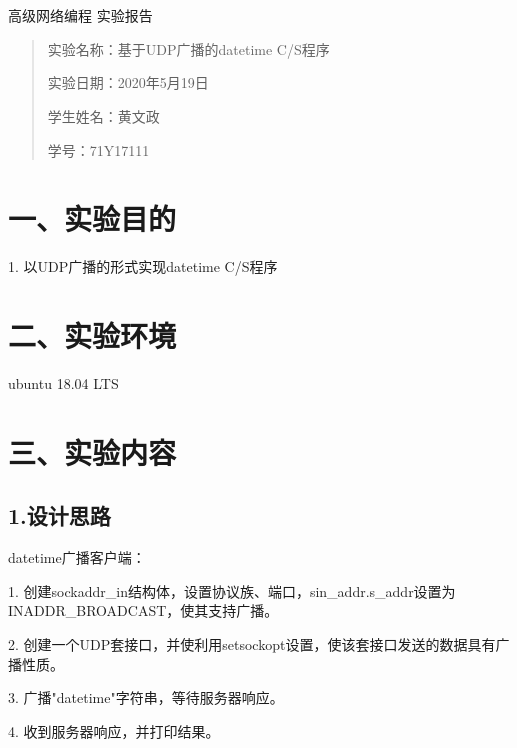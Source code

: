 \documentclass[UTF8]{ctexart}
\begin{document}
	\begin{center}
		\quad \\
		\quad \\
		\heiti \fontsize{45}{17} 高级网络编程
		\vskip 2.0cm
		\heiti \fontsize{39}{17} 实验报告	
	\end{center}
	\vskip 3.5cm
	\begin{quotation}
		\par\setlength\parindent{8.5em}
		\quad 
		\heiti 
		
		实验名称：基于UDP广播的datetime C/S程序
		
		实验日期：2020年5月19日
	
		学生姓名：黄文政
		
		学\hspace{0.72cm}号：71Y17111
		
		\vskip 2cm
		\centering
	\end{quotation}
	
\newpage
\songti \fontsize{13}{13}
\large
\section*{一、实验目的}

1. 以UDP广播的形式实现datetime C/S程序

\section*{二、实验环境}
ubuntu 18.04 LTS

\section*{三、实验内容}
\subsection*{1.设计思路}

datetime广播客户端：

1. 创建sockaddr\_in结构体，设置协议族、端口，sin\_addr.s\_addr设置为INADDR\_BROADCAST，使其支持广播。

2. 创建一个UDP套接口，并使利用setsockopt设置，使该套接口发送的数据具有广播性质。

3. 广播"datetime"字符串，等待服务器响应。

4. 收到服务器响应，并打印结果。
\end{document}
